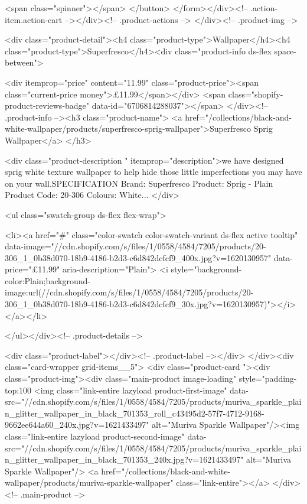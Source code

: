 {{{{{{{              <span class="spinner"></span>
            </button>
          </form></div><!-- .action-item.action-cart --></div><!-- .product-actions -->
</div><!-- .product-img -->

<div class="product-detail"><h4 class="product-type">Wallpaper</h4><h4 class="product-type">Superfresco</h4><div class="product-info ds-flex space-between">
    
<div itemprop="price" content="11.99" class="product-price"><span class="current-price money">£11.99</span></div>
    <span class="shopify-product-reviews-badge" data-id="6706814288037"></span>
  </div><!-- .product-info --><h3 class="product-name">
      <a href="/collections/black-and-white-wallpaper/products/superfresco-sprig-wallpaper">Superfresco Sprig Wallpaper</a>
    </h3>
    
<div class="product-description " itemprop="description">we have designed sprig white texture wallpaper to help hide those little imperfections you may have on your wall.SPECIFICATION Brand: Superfresco Product: Sprig - Plain Product Code: 20-306 Colours: White...
</div>



<ul class="swatch-group ds-flex flex-wrap">
        
<li><a href="#" class="color-swatch color-swatch-variant ds-flex active tooltip" data-image="//cdn.shopify.com/s/files/1/0558/4584/7205/products/20-306_1_0b38d070-18b9-4186-b2d3-c6d842dcfcf9_400x.jpg?v=1620130957" data-price="£11.99" aria-description="Plain">
              <i style="background-color:Plain;background-image:url(//cdn.shopify.com/s/files/1/0558/4584/7205/products/20-306_1_0b38d070-18b9-4186-b2d3-c6d842dcfcf9_30x.jpg?v=1620130957)"></i>
            </a></li>

      </ul></div><!-- .product-details -->

<div class="product-label"></div><!-- .product-label --></div>
          </div><div class="card-wrapper grid-items__5">
            <div class="product-card "><div class="product-img"><div class="main-product image-loading" style="padding-top:100%
      <img class="link-entire lazyload product-first-image" data-src="//cdn.shopify.com/s/files/1/0558/4584/7205/products/muriva_sparkle_plain_glitter_wallpaper_in_black_701353_roll_c43495d2-57f7-4712-9168-9662ee644a60_240x.jpg?v=1621433497" alt="Muriva Sparkle Wallpaper"/><img class="link-entire lazyload product-second-image" data-src="//cdn.shopify.com/s/files/1/0558/4584/7205/products/muriva_sparkle_plain_glitter_wallpaper_in_black_701353_240x.jpg?v=1621433497" alt="Muriva Sparkle Wallpaper"/>
      <a href="/collections/black-and-white-wallpaper/products/muriva-sparkle-wallpaper" class="link-entire"></a>
    </div><!-- .main-product -->
  
}}}}}}}
